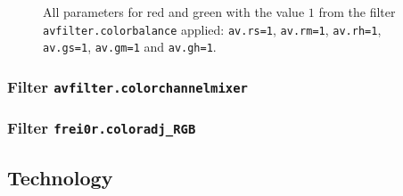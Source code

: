 \documentclass[../MasterThesis.tex]{subfiles}
\begin{document}
\begin{figure}[H]
	\begin{center}
		\label{figure:cb_yellow}
		\caption[All parameters for red and green with the value $1$ from the filter \texttt{avfilter.colorbalance} applied.]{All parameters for red and green with the value $1$  from the filter \texttt{avfilter.colorbalance} applied: \texttt{av.rs=1}, \texttt{av.rm=1}, \texttt{av.rh=1}, \texttt{av.gs=1}, \texttt{av.gm=1} and \texttt{av.gh=1}.}
	\end{center}
\end{figure}



\subsubsection*{Filter \texttt{avfilter.colorchannelmixer}}

\subsubsection*{Filter \texttt{frei0r.coloradj\_RGB}}













\subsection{Technology} \label{subsection:technology}








	
	
	
\end{document}
